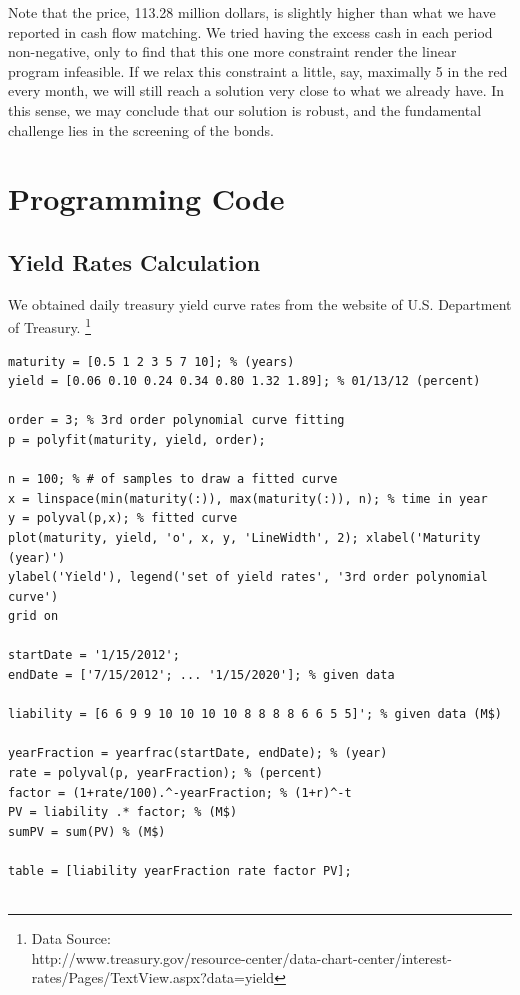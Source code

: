 \documentclass[oneside,12pt]{report}
\begin{document}
\noindent Note that the price, 113.28 million dollars, is slightly higher than what we have reported in cash flow matching. We tried having the excess cash in each period non-negative, only to find that this one more constraint render the linear program infeasible. If we relax this constraint a little, say, maximally 5 in the red every month, we will still reach a solution very close to what we already have. In this sense, we may conclude that our solution is robust, and the fundamental challenge lies in the screening of the bonds.

%
%
%

%
%
%
%
%
%


\appendix
{}
\chapter{Programming Code}\label{Programming Code}
\section{Yield Rates Calculation}
We obtained daily treasury yield curve rates from the website of U.S. Department of Treasury. \footnote{Data Source: \\
http://www.treasury.gov/resource-center/data-chart-center/interest-rates/Pages/TextView.aspx?data=yield} 
\begin{lstlisting}
maturity = [0.5 1 2 3 5 7 10]; % (years)
yield = [0.06 0.10 0.24 0.34 0.80 1.32 1.89]; % 01/13/12 (percent)
 
order = 3; % 3rd order polynomial curve fitting
p = polyfit(maturity, yield, order);
 
n = 100; % # of samples to draw a fitted curve
x = linspace(min(maturity(:)), max(maturity(:)), n); % time in year
y = polyval(p,x); % fitted curve
plot(maturity, yield, 'o', x, y, 'LineWidth', 2); xlabel('Maturity (year)')
ylabel('Yield'), legend('set of yield rates', '3rd order polynomial curve')
grid on
 
startDate = '1/15/2012';
endDate = ['7/15/2012'; ... '1/15/2020']; % given data
 
liability = [6 6 9 9 10 10 10 10 8 8 8 8 6 6 5 5]'; % given data (M$)
 
yearFraction = yearfrac(startDate, endDate); % (year)
rate = polyval(p, yearFraction); % (percent)
factor = (1+rate/100).^-yearFraction; % (1+r)^-t
PV = liability .* factor; % (M$)
sumPV = sum(PV) % (M$)
 
table = [liability yearFraction rate factor PV];


\end{lstlisting}
\end{document}
